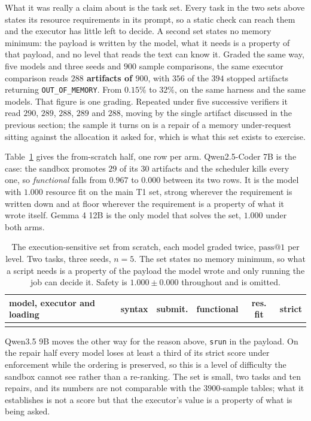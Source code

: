 \documentclass[11pt,a4paper]{article}
\begin{document}
What it was really a claim about is the task set. Every task in the two sets above states its
resource requirements in its prompt, so a static check can reach them and the executor has little
left to decide. A second set states no memory minimum: the payload is written by the model, what it
needs is a property of that payload, and no level that reads the text can know it. Graded the same
way, five models and three seeds and $900$ sample comparisons, the same executor comparison reads
\textbf{$288$ artifacts of $900$}, with $356$ of the $394$ stopped artifacts returning
\texttt{OUT\_OF\_MEMORY}. From $0.15\%$ to $32\%$, on the same harness and the same models.
That figure is one grading. Repeated under five successive verifiers it read $290$, $289$, $288$,
$289$ and $288$, moving by the single artifact discussed in the previous section; the sample it
turns on is a repair of a memory under-request sitting against the allocation it asked for, which
is what this set exists to exercise.

Table~\ref{tab:exec} gives the from-scratch half, one row per arm. Qwen2.5-Coder 7B is the case:
the sandbox promotes $29$ of its $30$ artifacts and the scheduler kills every one, so
\emph{functional} falls from $0.967$ to $0.000$ between its two rows. It is the model with $1.000$ resource fit on the main T1 set, strong
wherever the requirement is written down and at floor wherever the requirement is a property of what
it wrote itself. Gemma 4 12B is the only model that solves the set, $1.000$ under both arms.

\begin{table}[t]
\centering
\footnotesize
\setlength{\tabcolsep}{3pt}
\caption{The execution-sensitive set from scratch, each model graded twice, $\mathrm{pass}@1$ per
level. Two tasks, three seeds, $n=5$. The set states no memory minimum, so what a script needs is a
property of the payload the model wrote and only running the job can decide it. Safety is
$1.000 \pm 0.000$ throughout and is omitted.}
\label{tab:exec}
\begin{tabular}{lccccc}
\toprule
model, executor and loading & syntax & submit. & functional & res. fit & strict \\
\midrule
 \\
\bottomrule
\end{tabular}
\end{table}

Qwen3.5 9B moves the other way for the reason above, \texttt{srun} in the payload. On the repair
half every model loses at least a third of its strict score under enforcement while the ordering is
preserved, so this is a level of difficulty the sandbox cannot see rather than a re-ranking. The set
is small, two tasks and ten repairs, and its numbers are not comparable with the $3900$-sample
tables; what it establishes is not a score but that the executor's value is a property of what is
being asked.
\end{document}

